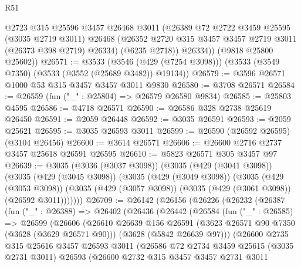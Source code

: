 \begin{lexlean}{R51}
\begin{coremodule}
          @2723
          @315
          @25596
          @3457
          @26468
          @3011
          (@26389
            @72
            @2722
            @3459
            @25595
            (@3035 @2719 @3011)
            @26468
            (@26352 @2720 @315 @3457 @3457 @2719 @3011 (@26373 @398 @2719) @26334)
            (@6235 @2718))
          @26334))
      (@9818 @25800 @25602))
@26571 := @3533
    (@3546 (@429 (@7254 @3098)))
    (@3533 (@3549 @7350) (@3533 (@3552 (@25689 @3482)) @19134))
@26579 := @3596 @26571 @1000 @53 @315 @3457 @3457 @3011 @9830
@26580 := @3708 @26571
@26584 := @26559 (fun ("_" : @25804) => @26579 @26580 @9834)
@26585 := @25803 @4595
@26586 := @4718 @26571
@26590 := @26586 @328 @2738 @25619 @26450
@26591 := @2059 @26448
@26592 := @3035 @26591
@26593 := @2059 @25621
@26595 := @3035 @26593 @3011
@26599 := @26590 (@26592 @26595) (@3104 @26456)
@26600 := @3614 @26571
@26606 := @26600 @2716 @2737 @3457 @25618 @26591 @26595
@26610 := @5823 @26571 @305 @3457 @97
@26639 := @3035
    (@3036 (@3037 @3098))
    (@3035
      (@429 (@3041 @3098))
      (@3035
        (@429 (@3045 @3098))
        (@3035
          (@429 (@3049 @3098))
          (@3035
            (@429 (@3053 @3098))
            (@3035 (@429 (@3057 @3098)) (@3035 (@429 (@3061 @3098)) (@26592 @3011)))))))
@26709 := @26142
    (@26156
      (@26226
        (@26232
          (@26387
            (fun ("_" : @26388) =>
            @26402
              (@26436
                (@26442
                  (@26584
                    (fun ("_" : @26585) =>
                    @26599
                      (@26606
                        (@26610
                          @26639
                          @156
                          @26591
                          (@3623 @26571 @90 @7350 (@3628 (@3629 @26571 @90)))
                          (@3628 (@5842 @26639 @97)))
                        (@26600
                          @2735
                          @315
                          @25616
                          @3457
                          @26593
                          @3011
                          (@26586
                            @72
                            @2734
                            @3459
                            @25615
                            (@3035 @2731 @3011)
                            @26593
                            (@26600
                              @2732
                              @315
                              @3457
                              @3457
                              @2731
                              @3011

\end{coremodule}
\end{lexlean}
